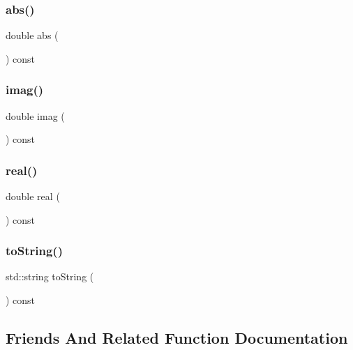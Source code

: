 \subsubsection{\texorpdfstring{abs()}{abs()}}
{\footnotesize\ttfamily double abs (\begin{DoxyParamCaption}{ }\end{DoxyParamCaption}) const}

\mbox{\label{classComplex_ac6d0f1ec6a24b5904bc3a206b3c117ff}} 
\subsubsection{\texorpdfstring{imag()}{imag()}}
{\footnotesize\ttfamily double imag (\begin{DoxyParamCaption}{ }\end{DoxyParamCaption}) const}

\mbox{\label{classComplex_a3a3f678878dde3a729f94dfefbdc4ef2}} 
\subsubsection{\texorpdfstring{real()}{real()}}
{\footnotesize\ttfamily double real (\begin{DoxyParamCaption}{ }\end{DoxyParamCaption}) const}

\mbox{\label{classComplex_a1fe5121d6528fdea3f243321b3fa3a49}} 
\subsubsection{\texorpdfstring{to\+String()}{toString()}}
{\footnotesize\ttfamily std\+::string to\+String (\begin{DoxyParamCaption}{ }\end{DoxyParamCaption}) const}



\subsection{Friends And Related Function Documentation}
\mbox{\label{classComplex_afcef21e5f4570416aa39a3412fb107c4}} 
